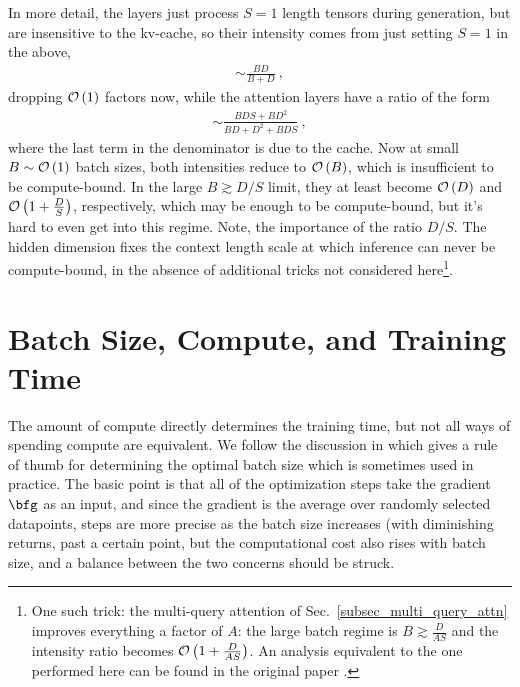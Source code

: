 \documentclass[11pt]{article}
\begin{document}
In more detail, the  layers just process $ S=1 $ length tensors during generation, but
are insensitive to the kv-cache, so their intensity comes from just setting $ S=1 $ in the above,
\begin{align}
   \sim \frac{ BD  }{ B + D } \ ,
\end{align}
dropping $\mathcal{O} \left( 1 \right)  $ factors now, while the attention layers have a ratio of the form
\begin{align}
    \sim \frac{ BDS+BD ^{ 2 } }{ BD + D ^{ 2 }+BDS }\ ,
\end{align}
where the last term in the denominator is due to the cache. Now at small $B \sim \mathcal{O} \left( 1
\right)  $ batch sizes, both intensities reduce to $ \mathcal{O} \left( B \right)  $, which is
insufficient to be compute-bound.  In the large $ B \gtrsim D/S $ limit, they at least become $ \mathcal{O} \left( D
\right)  $ and $ \mathcal{O} \left( 1 + \frac{ D }{ S } \right)  $, respectively, which may be enough to be
compute-bound, but it's hard to even get into this regime. Note, the importance of the ratio $ D/S
$. The hidden dimension fixes the context length scale at which inference can never be
compute-bound, in the absence of additional tricks not considered here\footnote{One such trick: the
    multi-query attention of Sec.~\ref{subsec_multi_query_attn} improves everything a factor of $
A $: the large batch regime is $ B \gtrsim \frac{ D }{ AS }$ and the intensity ratio becomes
$ \mathcal{O} \left( 1 + \frac{ D }{ AS } \right)  $. An analysis equivalent to the one performed here can be found in the original paper
\cite{shazeer2019fast}.}.


\section{Batch Size, Compute, and Training Time \label{app_batch_size}}

The amount of compute directly determines the training time, but not all ways of spending compute
are equivalent. We follow the discussion in \cite{mccandlish2018empirical} which gives a rule of thumb
for determining the optimal batch size which is sometimes used in practice. The basic point is that
all of the optimization steps take the gradient $ \bfg  $ as an input, and since the gradient is the
average over randomly selected datapoints, steps are more precise as the batch size increases (with
diminishing returns, past a certain point, but the computational cost also rises with batch size,
and a balance between the two concerns should be struck.
\end{document}
